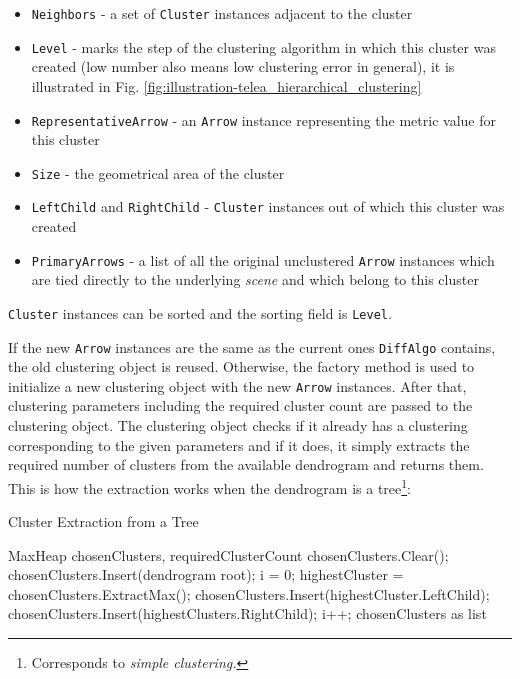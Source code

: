 \begin{itemize}
\item \verb+Neighbors+ - a set of \verb+Cluster+ instances adjacent to the cluster
\item \verb+Level+ - marks the step of the clustering algorithm in which this cluster was created (low number also means low clustering error in general), it is illustrated in Fig. \ref{fig:illustration-telea_hierarchical_clustering}
\item \verb+RepresentativeArrow+ - an \verb+Arrow+ instance representing the metric value for this cluster
\item \verb+Size+ - the geometrical area of the cluster
\item \verb+LeftChild+ and \verb+RightChild+ - \verb+Cluster+ instances out of which this cluster was created
\item \verb+PrimaryArrows+ - a list of all the original unclustered \verb+Arrow+ instances which are tied directly to the underlying {\it scene} and which belong to this cluster
\end{itemize}

\verb+Cluster+ instances can be sorted and the sorting field is \verb+Level+.

If the new \verb+Arrow+ instances are the same as the current ones \verb+DiffAlgo+ contains, the old clustering object is reused. Otherwise, the factory method is used to initialize a new clustering object with the new \verb+Arrow+ instances. After that, clustering parameters including the required cluster count are passed to the clustering object. The clustering object checks if it already has a clustering corresponding to the given parameters and if it does, it simply extracts the required number of clusters from the available dendrogram and returns them. This is how the extraction works when the dendrogram is a tree\footnote{Corresponds to {\it simple clustering.}}:

\begin{algorithm}[H]
\caption{Cluster Extraction from a Tree}
\label{algo:cluster_extract-tree}
\begin{algorithmic}[1]

\Require MaxHeap chosenClusters, requiredClusterCount
\Statex
\State chosenClusters.Clear();
\State chosenClusters.Insert(dendrogram root);
\State i = 0;
	\State highestCluster = chosenClusters.ExtractMax();
    \State chosenClusters.Insert(highestCluster.LeftChild);
    \State chosenClusters.Insert(highestClusters.RightChild);
    \State i++;
\EndWhile
\Statex
\Return chosenClusters as list
\end{algorithmic}
\end{algorithm}

